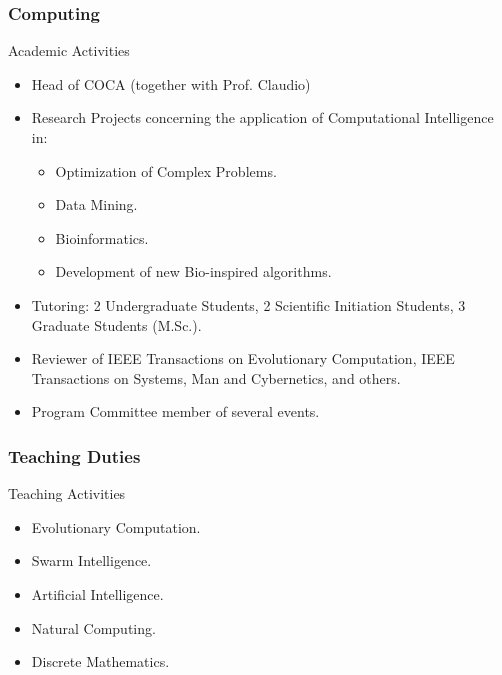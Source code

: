 \documentclass{beamer}
\begin{document}
\subsubsection{Computing}

\begin{frame}{Academic Activities}

\begin{itemize}
  \item Head of COCA (together with Prof. Claudio)
  \item Research Projects concerning the application of Computational Intelligence in: 
  \begin{itemize}
   \item Optimization of Complex Problems.
   \item Data Mining.
   \item Bioinformatics.
   \item Development of new Bio-inspired algorithms.
  \end{itemize}
  \item Tutoring: 2 Undergraduate Students, 2 Scientific Initiation Students, 3 Graduate Students (M.Sc.).
  \item Reviewer of IEEE Transactions on Evolutionary Computation, IEEE Transactions on Systems, Man and Cybernetics, and others.
  \item Program Committee member of several events.
\end{itemize}
\end{frame}

\subsubsection{Teaching Duties}

\begin{frame}{Teaching Activities}

\begin{itemize}
  \item Evolutionary Computation.
  \item Swarm Intelligence.
  \item Artificial Intelligence.
  \item Natural Computing.
  \item Discrete Mathematics.
\end{itemize}
\end{frame}
\end{document}
